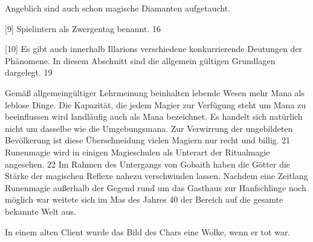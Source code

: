\documentclass[a4paper,11pt]{book}
\begin{document}
Angeblich sind auch schon magische Diamanten aufgetaucht.

[9] Spielintern als Zwergentag benannt.  16

[10] Es gibt auch innerhalb Illarions verschiedene konkurrierende Deutungen der Phänomene. In diesem Abschnitt sind die allgemein gültigen Grundlagen dargelegt.  19

Gemäß allgemeingültiger Lehrmeinung beinhalten lebende Wesen mehr Mana als leblose Dinge. Die Kapazität, die jedem Magier zur Verfügung steht um Mana zu beeinflussen wird landläufig auch als Mana bezeichnet. Es handelt sich natürlich nicht um dasselbe wie die Umgebungsmana. Zur Verwirrung der ungebildeten Bevölkerung ist diese Überschneidung vielen Magiern nur recht und billig.  21 Runenmagie wird in einigen Magieschulen als Unterart der Ritualmagie angesehen.  22 Im Rahmen des Untergangs von Gobaith haben die Götter die Stärke der magischen Reflexe nahezu verschwinden lassen. Nachdem eine Zeitlang Runenmagie außerhalb der Gegend rund um das Gasthaus zur Hanfschlinge noch möglich war weitete sich im Mas des Jahres 40 der Bereich auf die gesamte bekannte Welt aus.

In einem alten Client wurde das Bild des Chars eine Wolke, wenn er tot war.
\end{document}
